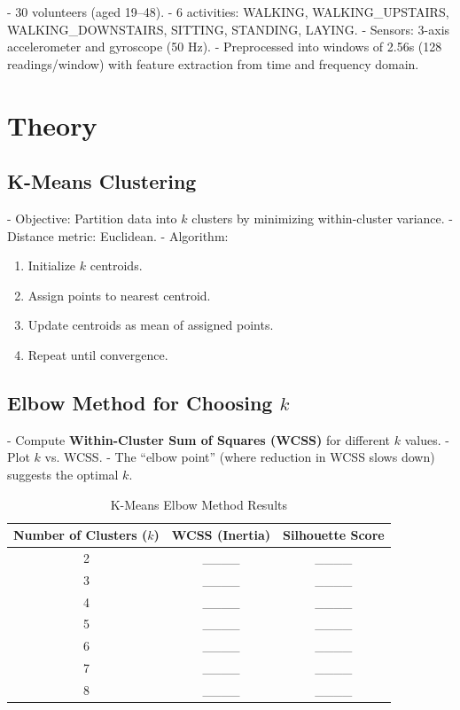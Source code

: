 \documentclass[11pt]{article}
\begin{document}
- 30 volunteers (aged 19–48).  
- 6 activities: WALKING, WALKING\_UPSTAIRS, WALKING\_DOWNSTAIRS, SITTING, STANDING, LAYING.  
- Sensors: 3-axis accelerometer and gyroscope (50 Hz).  
- Preprocessed into windows of 2.56s (128 readings/window) with feature extraction from time and frequency domain.  

\section*{Theory}
\subsection*{K-Means Clustering}
- Objective: Partition data into $k$ clusters by minimizing within-cluster variance.  
- Distance metric: Euclidean.  
- Algorithm:
\begin{enumerate}
    \item Initialize $k$ centroids.
    \item Assign points to nearest centroid.
    \item Update centroids as mean of assigned points.
    \item Repeat until convergence.
\end{enumerate}

\subsection*{Elbow Method for Choosing $k$}
- Compute \textbf{Within-Cluster Sum of Squares (WCSS)} for different $k$ values.  
- Plot $k$ vs. WCSS.  
- The ``elbow point'' (where reduction in WCSS slows down) suggests the optimal $k$.  

\begin{table}[!h]
\centering
\caption{K-Means Elbow Method Results}
\renewcommand{\arraystretch}{1.3}
\begin{tabular}{|c|c|c|}
\hline
\textbf{Number of Clusters ($k$)} & \textbf{WCSS (Inertia)} & \textbf{Silhouette Score} \\
\hline
2 &  \_\_\_\_ & \_\_\_\_ \\
3 &  \_\_\_\_ & \_\_\_\_ \\
4 &  \_\_\_\_ & \_\_\_\_ \\
5 &  \_\_\_\_ & \_\_\_\_ \\
6 &  \_\_\_\_ & \_\_\_\_ \\
7 &  \_\_\_\_ & \_\_\_\_ \\
8 &  \_\_\_\_ & \_\_\_\_ \\
\hline
\end{tabular}
\end{table}
\end{document}
